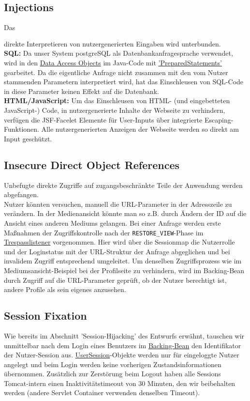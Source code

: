 \documentclass{article}
\begin{document}
\subsection{Injections}
\hypertarget{Injections}{Das} direkte Interpretieren von nutzergenerierten Eingaben wird unterbunden.\\
\textbf{SQL:} Da unser System postgreSQL als Datenbankanfragesprache verwendet, wird in den \hyperlink{DAOs}{Data Access Objects} im Java-Code mit \hyperlink{https://docs.oracle.com/javase/7/docs/api/java/sql/PreparedStatement.html}{'PreparedStatements'} gearbeitet. Da die eigentliche Anfrage nicht zusammen mit den vom Nutzer stammenden Parametern interpretiert wird, hat das Einschleusen von SQL-Code in diese Parameter keinen Effekt auf die Datenbank.\\
\textbf{HTML/JavaScript:} \hypertarget{XSS}{Um} das Einschleusen von HTML- (und eingebetteten JavaScript-) Code, in nutzergenerierte Inhalte der Webseite zu verhindern, verfügen die JSF-Facelet Elemente für User-Inputs über integrierte Escaping-Funktionen. Alle nutzergenerierten Anzeigen der Webseite werden so direkt am Input geschützt.
\subsection{Insecure Direct Object References}
Unbefugte direkte Zugriffe auf zugangsbeschränkte Teile der Anwendung werden abgefangen.\\ 
Nutzer könnten versuchen, manuell die URL-Parameter in der Adresszeile zu verändern. In der Medienansicht könnte man so z.B. durch Ändern der ID auf die Ansicht eines anderen Mediums gelangen. Bei einer Anfrage werden erste Maßnahmen der Zugriffskontrolle nach der \texttt{RESTORE\_VIEW}-Phase im \hyperlink{PhaseListener}{Trespasslistener} vorgenommen. Hier wird über die Sessionmap die Nutzerrolle und der Loginstatus mit der URL-Struktur der Anfrage abgeglichen und bei invalidem Zugriff entsprechend umgeleitet. Um denselben Zugriffsprozess wie im Mediumsansicht-Beispiel bei der Profilseite zu verhindern, wird im Backing-Bean durch Zugriff auf die URL-Parameter geprüft, ob der Nutzer berechtigt ist, andere Profile als sein eigenes anzusehen. 
\subsection{Session Fixation}
Wie bereits im Abschnitt 'Session-Hijacking' des Entwurfs erwähnt, tauschen wir unmittelbar nach dem Login eines Benutzers im \hyperlink{Login}{Backing-Bean} den Identifikator der Nutzer-Session aus. \hyperlink{Session}{UserSession}-Objekte werden nur für eingeloggte Nutzer angelegt und beim Login werden keine vorherigen Zustandsinformationen übernommen.  Zusätzlich zur Zerstörung beim Logout haben alle Sessions Tomcat-intern einen Inaktivitätstimeout von 30 Minuten, den wir beibehalten werden (andere Servlet Container verwenden denselben Timeout).
\end{document}
